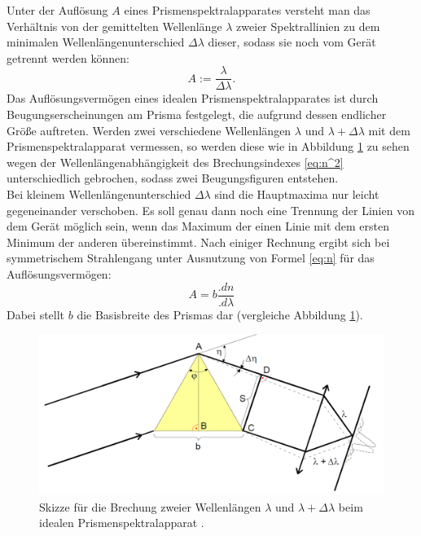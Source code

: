 Unter der Auflösung $A$ eines Prismenspektralapparates versteht man das Verhältnis von der gemittelten Wellenlänge $\lambda$ zweier Spektrallinien zu dem minimalen Wellenlängenunterschied $\Delta\lambda$ dieser, sodass sie noch vom Gerät getrennt werden können:
\[
A := \frac{\lambda}{\Delta\lambda}\text{.}
\]
Das Auflösungsvermögen eines idealen Prismenspektralapparates ist durch Beugungserscheinungen am Prisma festgelegt, die aufgrund dessen endlicher Größe auftreten. Werden zwei verschiedene Wellenlängen $\lambda$ und $\lambda +\Delta\lambda$ mit dem Prismenspektralapparat vermessen, so werden diese wie in Abbildung \ref{fig:Aufloesungsvermoegen} zu sehen wegen der Wellenlängenabhängigkeit des Brechungsindexes \eqref{eq:n^2} unterschiedlich gebrochen, sodass zwei Beugungsfiguren entstehen.\\
Bei kleinem Wellenlängenunterschied $\Delta\lambda$ sind die Hauptmaxima nur leicht gegeneinander verschoben. Es soll genau dann noch eine Trennung der Linien von dem Gerät möglich sein, wenn das Maximum der einen Linie mit dem ersten Minimum der anderen übereinstimmt. Nach einiger Rechnung ergibt sich bei symmetrischem Strahlengang unter Ausnutzung von Formel \eqref{eq:n} für das Auflösungsvermögen:
\begin{equation}
A = b\frac{.dn}{.d\lambda}\label{eq:A}
\end{equation}   
Dabei stellt $b$ die Basisbreite des Prismas dar (vergleiche Abbildung \ref{fig:Aufloesungsvermoegen}). 

\begin{figure}
\centering
\includegraphics[width=\linewidth-50pt,height=\textheight-50pt,keepaspectratio]{content/images/Aufloesungsvermoegen.png}
\caption{Skizze für die Brechung zweier Wellenlängen $\lambda$ und $\lambda +\Delta\lambda$ beim idealen Prismenspektralapparat \cite{V402}.}
\label{fig:Aufloesungsvermoegen}
\end{figure}



